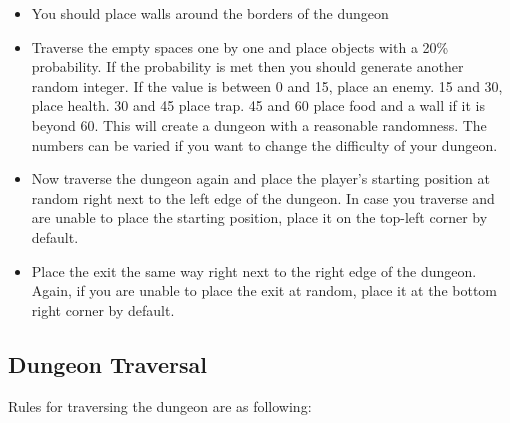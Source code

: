 \documentclass[a4paper,12pt]{article}
\begin{document}
\begin{itemize}
	\item You should place walls around the borders of the dungeon
	\item Traverse the empty spaces one by one and place objects with a 20\% probability. If the probability is met then you should generate another random integer. If the value is between 0 and 15, place an enemy. 15 and 30, place health. 30 and 45 place trap. 45 and 60 place food and a wall if it is beyond 60. This will create a dungeon with a reasonable randomness. The numbers can be varied if you want to change the difficulty of your dungeon.
	\item Now traverse the dungeon again and place the player's starting position at random right next to the left edge of the dungeon. In case you traverse and are unable to place the starting position, place it on the top-left corner by default.
	\item Place the exit the same way right next to the right edge of the dungeon. Again, if you are unable to place the exit at random, place it at the bottom right corner by default.
\end{itemize}

\subsection{Dungeon Traversal}
Rules for traversing the dungeon are as following:
\end{document}
